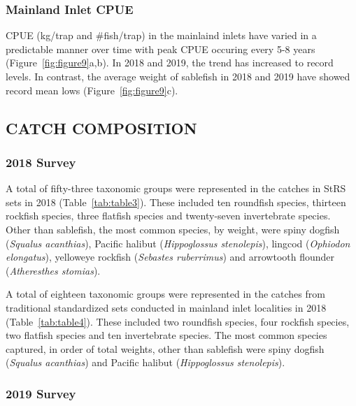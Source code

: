 \documentclass[12pt]{article}\usepackage[]{graphicx}\usepackage[]{color}
\begin{document}
\hypertarget{mainland-inlet-cpue}{%
\subsubsection{Mainland Inlet CPUE}\label{mainland-inlet-cpue}}

CPUE (kg/trap and \#fish/trap) in the mainlaind inlets have varied in a predictable manner over time with peak CPUE occuring every 5-8 years (Figure~\ref{fig:figure9}a,b). In 2018 and 2019, the trend has increased to record levels. In contrast, the average weight of sablefish in 2018 and 2019 have showed record mean lows (Figure~\ref{fig:figure9}c).

\hypertarget{catch-composition}{%
\subsection{CATCH COMPOSITION}\label{catch-composition}}

\hypertarget{survey-2}{%
\subsubsection{2018 Survey}\label{survey-2}}

A total of fifty-three taxonomic groups were represented in the catches in StRS sets in 2018 (Table~\ref{tab:table3}). These included ten roundfish species, thirteen rockfish species, three flatfish species and twenty-seven invertebrate species. Other than sablefish, the most common species, by weight, were spiny dogfish (\emph{Squalus acanthias}), Pacific halibut (\emph{Hippoglossus stenolepis}), lingcod (\emph{Ophiodon elongatus}), yelloweye rockfish (\emph{Sebastes ruberrimus}) and arrowtooth flounder (\emph{Atheresthes stomias}).

A total of eighteen taxonomic groups were represented in the catches from traditional standardized sets conducted in mainland inlet localities in 2018 (Table~\ref{tab:table4}). These included two roundfish species, four rockfish species, two flatfish species and ten invertebrate species. The most common species captured, in order of total weights, other than sablefish were spiny dogfish (\emph{Squalus acanthias}) and Pacific halibut (\emph{Hippoglossus stenolepis}).

\hypertarget{survey-3}{%
\subsubsection{2019 Survey}\label{survey-3}}
\end{document}
